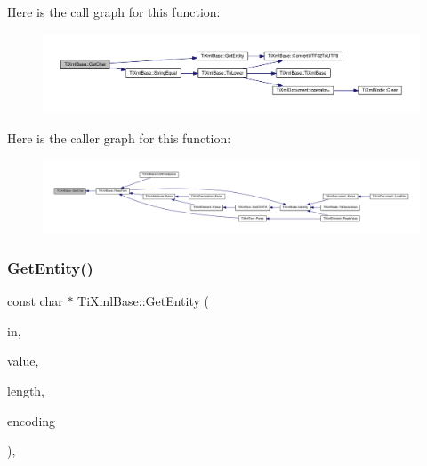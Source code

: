 Here is the call graph for this function\+:\nopagebreak
\begin{figure}[H]
\begin{center}
\leavevmode
\includegraphics[width=350pt]{class_ti_xml_base_a5b0fde72d6f662ae1fd6303195d2159b_cgraph}
\end{center}
\end{figure}
Here is the caller graph for this function\+:\nopagebreak
\begin{figure}[H]
\begin{center}
\leavevmode
\includegraphics[width=350pt]{class_ti_xml_base_a5b0fde72d6f662ae1fd6303195d2159b_icgraph}
\end{center}
\end{figure}
\mbox{\label{class_ti_xml_base_ac5c08bf3deffcda0bf8ce2958372b584}} 
\subsubsection{\texorpdfstring{Get\+Entity()}{GetEntity()}}
{\footnotesize\ttfamily const char $\ast$ Ti\+Xml\+Base\+::\+Get\+Entity (\begin{DoxyParamCaption}\item[{const char $\ast$}]{in,  }\item[{char $\ast$}]{value,  }\item[{int $\ast$}]{length,  }\item[{\hyperlink{tinyxml_8h_a88d51847a13ee0f4b4d320d03d2c4d96}{Ti\+Xml\+Encoding}}]{encoding }\end{DoxyParamCaption})\hspace{0.3cm}{\ttfamily [static]}, {\ttfamily [protected]}}

